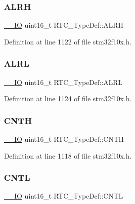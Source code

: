 \subsubsection{\texorpdfstring{A\+L\+RH}{ALRH}}
{\footnotesize\ttfamily \hyperlink{core__sc300_8h_aec43007d9998a0a0e01faede4133d6be}{\+\_\+\+\_\+\+IO} uint16\+\_\+t R\+T\+C\+\_\+\+Type\+Def\+::\+A\+L\+RH}



Definition at line 1122 of file stm32f10x.\+h.

\mbox{\label{struct_r_t_c___type_def_afea5d3abb40323a5385cf461094c06d3}} 
\subsubsection{\texorpdfstring{A\+L\+RL}{ALRL}}
{\footnotesize\ttfamily \hyperlink{core__sc300_8h_aec43007d9998a0a0e01faede4133d6be}{\+\_\+\+\_\+\+IO} uint16\+\_\+t R\+T\+C\+\_\+\+Type\+Def\+::\+A\+L\+RL}



Definition at line 1124 of file stm32f10x.\+h.

\mbox{\label{struct_r_t_c___type_def_a094741bcc8fca018b500f7468531f0ef}} 
\subsubsection{\texorpdfstring{C\+N\+TH}{CNTH}}
{\footnotesize\ttfamily \hyperlink{core__sc300_8h_aec43007d9998a0a0e01faede4133d6be}{\+\_\+\+\_\+\+IO} uint16\+\_\+t R\+T\+C\+\_\+\+Type\+Def\+::\+C\+N\+TH}



Definition at line 1118 of file stm32f10x.\+h.

\mbox{\label{struct_r_t_c___type_def_a212cb62d18ce312bc3f69641aa76688d}} 
\subsubsection{\texorpdfstring{C\+N\+TL}{CNTL}}
{\footnotesize\ttfamily \hyperlink{core__sc300_8h_aec43007d9998a0a0e01faede4133d6be}{\+\_\+\+\_\+\+IO} uint16\+\_\+t R\+T\+C\+\_\+\+Type\+Def\+::\+C\+N\+TL}



